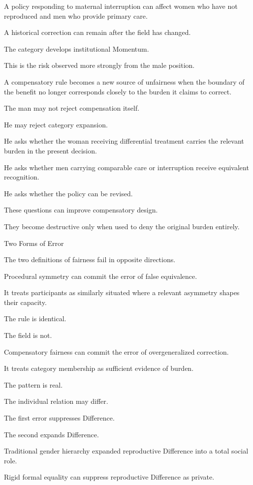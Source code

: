 A policy responding to maternal interruption can affect women who have not reproduced and men who provide primary care.

A historical correction can remain after the field has changed.

The category develops institutional Momentum.

This is the risk observed more strongly from the male position.

A compensatory rule becomes a new source of unfairness when the boundary of the benefit no longer corresponds closely to the burden it claims to correct.

The man may not reject compensation itself.

He may reject category expansion.

He asks whether the woman receiving differential treatment carries the relevant burden in the present decision.

He asks whether men carrying comparable care or interruption receive equivalent recognition.

He asks whether the policy can be revised.

These questions can improve compensatory design.

They become destructive only when used to deny the original burden entirely.

Two Forms of Error

The two definitions of fairness fail in opposite directions.

Procedural symmetry can commit the error of false equivalence.

It treats participants as similarly situated where a relevant asymmetry shapes their capacity.

The rule is identical.

The field is not.

Compensatory fairness can commit the error of overgeneralized correction.

It treats category membership as sufficient evidence of burden.

The pattern is real.

The individual relation may differ.

The first error suppresses Difference.

The second expands Difference.

Traditional gender hierarchy expanded reproductive Difference into a total social role.

Rigid formal equality can suppress reproductive Difference as private.

